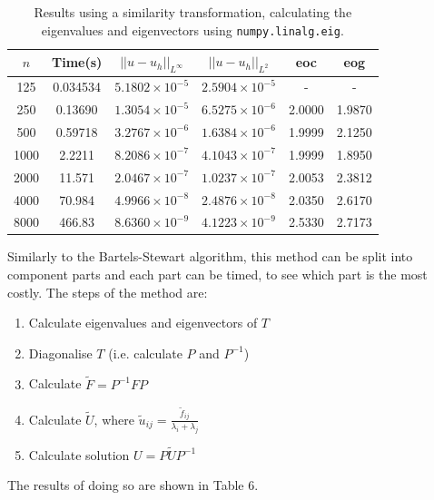 \documentclass{article}
\numberwithin{equation}{section}
\begin{document}
\begin{table}[H]
\centering
\begin{tabular}{|c|c|c|c|c|c|}
\hline
$n$ & Time(s) & $|| u - u_h ||_{L^{\infty}}$ &$|| u - u_h ||_{L^{2}}$ & eoc & eog \\
\hline
125 & 0.034534 & $5.1802 \times 10^{-5}$ & $2.5904 \times 10^{-5}$ & -  & - \\
250 & 0.13690 & $1.3054 \times 10^{-5}$ & $6.5275 \times 10^{-6}$ & 2.0000 & 1.9870  \\
500 & 0.59718 & $3.2767 \times 10^{-6}$ & $1.6384 \times 10^{-6}$ & 1.9999 & 2.1250  \\
1000 & 2.2211 & $8.2086 \times 10^{-7}$ & $4.1043 \times 10^{-7}$ & 1.9999 & 1.8950  \\
2000 & 11.571 & $2.0467 \times 10^{-7}$ & $1.0237 \times 10^{-7}$ & 2.0053 & 2.3812  \\
4000 & 70.984 & $4.9966 \times 10^{-8}$ & $2.4876 \times 10^{-8}$ & 2.0350 & 2.6170  \\
8000 & 466.83 & $8.6360 \times 10^{-9}$ & $4.1223 \times 10^{-9}$ & 2.5330 & 2.7173  \\
\hline
\end{tabular}
\captionsetup{justification=centering}
\caption{Results using a similarity transformation, calculating the eigenvalues and eigenvectors using \texttt{numpy.linalg.eig}.}
\end{table}

Similarly to the Bartels-Stewart algorithm, this method can be split into component parts and each part can be timed, to see which part is the most costly. The steps of the method are:
\begin{enumerate}
\item Calculate eigenvalues and eigenvectors of $T$
\item Diagonalise $T$ (i.e. calculate $P$ and $P^{-1}$)
\item Calculate $\tilde{F}=P^{-1}FP$
\item Calculate $\tilde{U}$, where $\tilde{u}_{ij} = \frac{\tilde{f}_{ij}}{\lambda_i + \lambda_j}$
\item Calculate solution $U=P \tilde{U}P^{-1}$
\end{enumerate}

The results of doing so are shown in Table 6.
\end{document}
